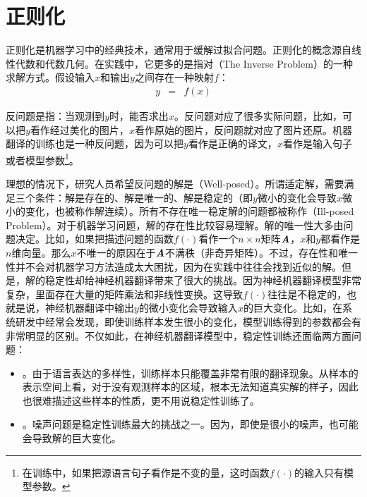 
\sectionnewpage
\section{正则化}\label{subsection-13.2}

\parinterval 正则化是机器学习中的经典技术，通常用于缓解过拟合问题。正则化的概念源自线性代数和代数几何。在实践中，它更多的是指对{\small{}}（The Inverse Problem）的一种求解方式。假设输入$x$和输出$y$之间存在一种映射$f$：
\begin{eqnarray}
y &=& f(x)
\label{eq:13-1}
\end{eqnarray}

\noindent 反问题是指：当观测到$y$时，能否求出$x$。反问题对应了很多实际问题，比如，可以把$y$看作经过美化的图片，$x$看作原始的图片，反问题就对应了图片还原。机器翻译的训练也是一种反问题，因为可以把$y$看作是正确的译文，$x$看作是输入句子或者模型参数\footnote{在训练中，如果把源语言句子看作是不变的量，这时函数$f(\cdot)$的输入只有模型参数。}。

\parinterval 理想的情况下，研究人员希望反问题的解是{\small{}}（Well-posed）。所谓适定解，需要满足三个条件：解是存在的、解是唯一的、解是稳定的（即$y$微小的变化会导致$x$微小的变化，也被称作解连续）。所有不存在唯一稳定解的问题都被称作{\small{}}（Ill-posed Problem）。对于机器学习问题，解的存在性比较容易理解。解的唯一性大多由问题决定。比如，如果把描述问题的函数$f(\cdot)$看作一个$n\times n$矩阵$\textbf{\em A}$，$x$和$y$都看作是$n$维向量。那么$x$不唯一的原因在于$\textbf{\em A}$不满秩（非奇异矩阵）。不过，存在性和唯一性并不会对机器学习方法造成太大困扰，因为在实践中往往会找到近似的解。但是，解的稳定性却给神经机器翻译带来了很大的挑战。因为神经机器翻译模型非常复杂，里面存在大量的矩阵乘法和非线性变换。这导致$f(\cdot)$往往是不稳定的，也就是说，神经机器翻译中输出$y$的微小变化会导致输入$x$的巨大变化。比如，在系统研发中经常会发现，即使训练样本发生很小的变化，模型训练得到的参数都会有非常明显的区别。不仅如此，在神经机器翻译模型中，稳定性训练还面临两方面问题：

\begin{itemize}
\vspace{0.5em}
\item {\small{}}。由于语言表达的多样性，训练样本只能覆盖非常有限的翻译现象。从样本的表示空间上看，对于没有观测样本的区域，根本无法知道真实解的样子，因此也很难描述这些样本的性质，更不用说稳定性训练了。
\vspace{0.5em}
\item {\small{}}。噪声问题是稳定性训练最大的挑战之一。因为，即使是很小的噪声，也可能会导致解的巨大变化。
\vspace{0.5em}
\end{itemize}

